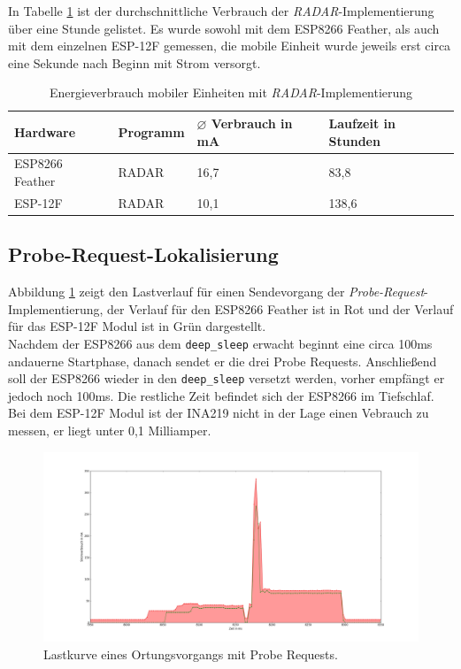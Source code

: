 In Tabelle \ref{table:radarina} ist der durchschnittliche Verbrauch der \emph{RADAR}-Implementierung über eine Stunde gelistet.
Es wurde sowohl mit dem ESP8266 Feather, als auch mit dem einzelnen ESP-12F gemessen, die mobile Einheit wurde jeweils erst circa eine Sekunde nach Beginn mit Strom versorgt.

\begin{table}[h!]
	\centering
	\caption{Energieverbrauch mobiler Einheiten mit \emph{RADAR}-Implementierung}
	\label{table:radarina}
	\begin{tabular}{p{3.5cm}|p{5cm}|p{2.5cm}|p{2.5cm}}
		Hardware & Programm & $\varnothing$ Verbrauch in mA & Laufzeit in Stunden\\
		\hline
		ESP8266 Feather & RADAR & 16,7 & 83,8\\
		ESP-12F & RADAR & 10,1 & 138,6\\
	\end{tabular}
\end{table}

\subsection{Probe-Request-Lokalisierung}
\label{ch:phase2:sec:powerprobereq}
Abbildung \ref{fig:probereqv} zeigt den Lastverlauf für einen Sendevorgang der \emph{Probe-Request}-Implementierung, der Verlauf für den ESP8266 Feather ist in Rot und der Verlauf für das ESP-12F Modul ist in Grün dargestellt.\\
Nachdem der ESP8266 aus dem \texttt{deep\_sleep} erwacht beginnt eine circa 100ms andauerne Startphase, danach sendet er die drei Probe Requests.
Anschließend soll der ESP8266 wieder in den \texttt{deep\_sleep} versetzt werden, vorher empfängt er jedoch noch 100ms.
Die restliche Zeit befindet sich der ESP8266 im Tiefschlaf. 
Bei dem ESP-12F Modul ist der INA219 nicht in der Lage einen Vebrauch zu messen, er liegt unter 0,1 Milliamper.\\

\begin{figure}[h!]
  \centering
	\includegraphics[width=\textwidth]{plots/probereqv.png}
  \caption{Lastkurve eines Ortungsvorgangs mit Probe Requests.}
  \label{fig:probereqv}
\end{figure}

